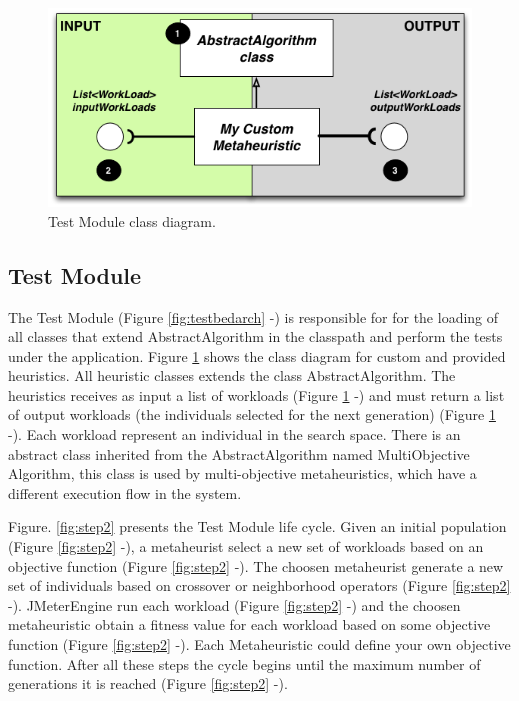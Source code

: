 \documentclass{report}
\begin{document}
\begin{figure}[h]
\begin{minipage}{.5\textwidth}
\centering
\includegraphics[width=1\textwidth]{./images/myheuristic.png}
\caption{Test Module class diagram.}
\label{fig:heuristicclassdiagram}
\end{minipage}
\end{figure}



\subsection{Test Module}

The Test Module (Figure \ref{fig:testbedarch}  -) is responsible for for the loading of all classes that extend AbstractAlgorithm in the classpath and perform the tests under the application. Figure \ref{fig:heuristicclassdiagram} shows the  class diagram for custom and provided heuristics. All heuristic classes extends the class AbstractAlgorithm. The heuristics receives  as input a  list of workloads (Figure \ref{fig:heuristicclassdiagram}  -) and must return a list of output workloads (the individuals selected for the next generation)  (Figure \ref{fig:heuristicclassdiagram}  -). Each workload represent an individual in the search space. There is an abstract class inherited from the AbstractAlgorithm named MultiObjective Algorithm, this class is used by multi-objective metaheuristics, which have a different execution flow in the system.

Figure. \ref{fig:step2} presents the Test Module life cycle. Given an initial population (Figure \ref{fig:step2}  -),  a metaheurist select a new set of workloads based on an objective function (Figure \ref{fig:step2}  -). The choosen metaheurist generate a new set of individuals based on crossover or neighborhood operators (Figure \ref{fig:step2}  -).  JMeterEngine run each workload (Figure \ref{fig:step2}  -) and the choosen metaheuristic obtain a fitness value for each workload based on some objective function  (Figure \ref{fig:step2}  -). Each Metaheuristic could define your own objective function. After all these steps the cycle begins until the maximum number of generations it is reached (Figure \ref{fig:step2}  -).
\end{document}
